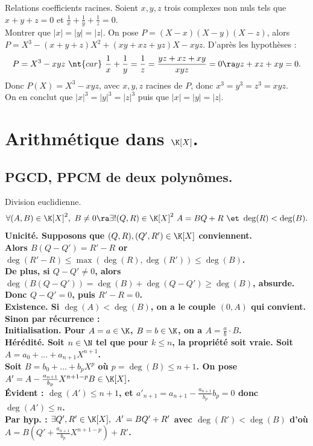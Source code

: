 \documentclass[11pt]{article}
\begin{document}
\begin{ex}{Relations coefficients racines.}{}
    Soient $x,y,z$ trois complexes non nuls tels que $x+y+z=0$ et $\frac{1}{x}+\frac{1}{y}+\frac{1}{z}=0$.\\
    Montrer que $|x|=|y|=|z|$.
    \tcblower
    On pose $P=(X-x)(X-y)(X-z)$, alors $P=X^3-(x+y+z)X^2+(xy+xz+yz)X-xyz$. D'après les hypothèses :
    \begin{equation*}
        P=X^3-xyz ~ \nt{car} ~ \frac{1}{x}+\frac{1}{y}=\frac{1}{z}=\frac{yz+xz+xy}{xyz} = 0 \ra yz+xz+xy=0.
    \end{equation*}
    Donc $P(X)=X^3-xyz$, avec $x,y,z$ racines de $P$, donc $x^3=y^3=z^3=xyz$.\\
    On en conclut que $|x|^3=|y|^3=|z|^3$ puis que $|x|=|y|=|z|$.
\end{ex}

\section{Arithmétique dans \texorpdfstring{$\K[X]$}{Lg}.}

\subsection{PGCD, PPCM de deux polynômes.}

\begin{prop}{Division euclidienne.}{}
    \begin{equation*}
        \forall (A,B) \in \K[X]^2, ~ B\neq0 \ra \exists!(Q,R) \in \K[X]^2 ~ A = BQ + R ~\et~ \deg(R) < \deg(B).
    \end{equation*}
    \tcblower
    \bf{Unicité.} Supposons que $(Q,R),(Q',R')\in\K[X]$ conviennent.\\
    Alors $B(Q-Q')=R'-R$ or $\deg(R'-R)\leq\max(\deg(R),\deg(R'))\leq\deg(B)$.\\
    De plus, si $Q-Q'\neq0$, alors $\deg(B(Q-Q'))=\deg(B)+\deg(Q-Q')\geq\deg(B)$, absurde.\\
    Donc $Q-Q'=0$, puis $R'-R=0$.\\
    \bf{Existence.} Si $\deg(A)<\deg(B)$, on a le couple $(0,A)$ qui convient. Sinon par récurrence :\\
    \bf{Initialisation.} Pour $A=a\in\K$, $B=b\in\K$, on a $A=\frac{a}{b}\cdot B$.\\
    \bf{Hérédité.} Soit $n\in\N$ tel que pour $k\leq n$, la propriété soit vraie. Soit $A=a_0+...+a_{n+1}X^{n+1}$.\\
    Soit $B=b_0+...+b_pX^p$ où $p=\deg(B)\leq n+1$. On pose $A'=A-\frac{a_{n+1}}{b_p}X^{n+1-p}B\in\K[X]$.\\
    Évident : $\deg(A')\leq n+1$, et $a'_{n+1}=a_{n+1}-\frac{a_{n+1}}{b_p}b_p=0$ donc $\deg(A')\leq n$.\\
    Par hyp. : $\exists Q',R'\in\K[X], ~ A'=BQ'+R'$ avec $\deg(R')<\deg(B)$ d'où $A=B(Q'+\frac{a_{n+1}}{b_p}X^{n+1-p})+R'$.
\end{prop}
\end{document}
